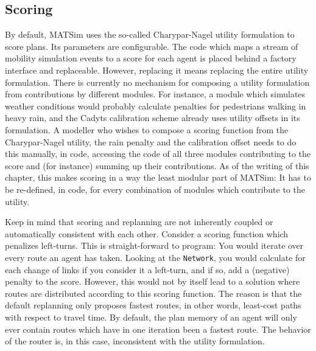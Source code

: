 \subsection{Scoring}
\label{sec:scoring-extension-point}

By default, MATSim uses the so-called Charypar-Nagel utility formulation to score plans. Its parameters
are configurable.
The code which maps a stream of mobility simulation events to a score for each agent is placed behind a factory
 interface and replaceable. However, replacing it means replacing the entire utility formulation. There is
 currently no mechanism for composing a utility formulation from contributions by different modules.
For instance, a module which simulates weather conditions would probably calculate penalties for pedestrians
  walking in heavy rain, and the Cadyts calibration scheme already uses utility offsets in its formulation. A modeller
  who wishes to compose a scoring function from the Charypar-Nagel utility, the rain penalty and the calibration offset
  needs to do this manually, in code, accessing the code of all three modules contributing to the score and (for instance) summing
  up their contributions. As of the writing of this chapter, this makes scoring in a way the least modular part of MATSim: It has to 
be re-defined, in code, for every combination of modules which contribute to the utility.

Keep in mind that scoring and replanning are not inherently coupled or automatically consistent with each other. 
Consider a scoring function which penalizes left-turns. This is straight-forward to program: You would 
iterate over every route an agent has taken. Looking at the \lstinline$Network$, you would calculate for each change of
links if you consider it a left-turn, and if so, add a (negative) penalty to the score. However, this would not by itself lead to a
solution where routes are distributed according to this scoring function. The reason is that the default replanning only proposes
 fastest routes, in other words, least-cost paths with respect to travel time. By default, the plan memory of an agent will only ever
 contain routes which have in one iteration been a fastest route. The behavior of the router is, in this case, inconsistent with the utility
 formulation.
   


